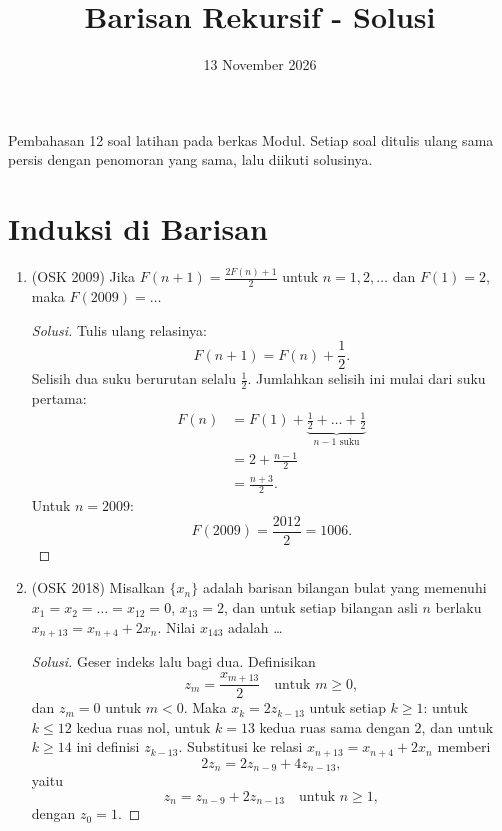 \documentclass[12pt]{scrartcl}
\title{Barisan Rekursif - Solusi}
\date{13 November 2026}
\begin{document}
\maketitle

\renewcommand*\contentsname{Daftar Isi}
\tableofcontents

\newpage

Pembahasan 12 soal latihan pada berkas Modul. Setiap soal ditulis ulang sama
persis dengan penomoran yang sama, lalu diikuti solusinya.

\section{Induksi di Barisan}

\begin{enumerate}

	\item (OSK 2009)
	Jika $F(n+1)=\frac{2F(n)+1}{2}$ untuk $n=1,2,\dots$ dan $F(1)=2$, maka $F(2009)=\dots$
	\begin{proof}[Solusi]
	\renewcommand{\qedsymbol}{$\blacksquare$}
	Tulis ulang relasinya:
	\[ F(n+1) = F(n) + \frac{1}{2}. \]
	Selisih dua suku berurutan selalu $\frac12$. Jumlahkan selisih ini mulai
	dari suku pertama:
	\begin{align*}
	F(n) &= F(1) + \underbrace{\frac12 + \dots + \frac12}_{n-1 \text{ suku}} \\
	&= 2 + \frac{n-1}{2} \\
	&= \frac{n+3}{2}.
	\end{align*}
	Untuk $n = 2009$:
	\[ F(2009) = \frac{2012}{2} = 1006. \]
	\end{proof}

	\item (OSK 2018)
	Misalkan $\{x_{n}\}$ adalah barisan bilangan bulat yang memenuhi $x_{1}=x_{2}=\dots=x_{12}=0$, $x_{13}=2$, dan untuk setiap bilangan asli $n$ berlaku $x_{n+13}=x_{n+4}+2x_{n}$. Nilai $x_{143}$ adalah \dots
	\begin{proof}[Solusi]
	\renewcommand{\qedsymbol}{$\blacksquare$}
	Geser indeks lalu bagi dua. Definisikan
	\[ z_m = \frac{x_{m+13}}{2} \quad \text{untuk } m \ge 0, \]
	dan $z_m = 0$ untuk $m < 0$. Maka $x_k = 2z_{k-13}$ untuk setiap $k \ge 1$:
	untuk $k \le 12$ kedua ruas nol, untuk $k = 13$ kedua ruas sama dengan $2$,
	dan untuk $k \ge 14$ ini definisi $z_{k-13}$.
	Substitusi ke relasi $x_{n+13} = x_{n+4} + 2x_n$ memberi
	\[ 2z_n = 2z_{n-9} + 4z_{n-13}, \]
	yaitu
	\[ z_n = z_{n-9} + 2z_{n-13} \quad \text{untuk } n \ge 1, \]
	dengan $z_0 = 1$.


\end{proof}
\end{enumerate}
\end{document}

